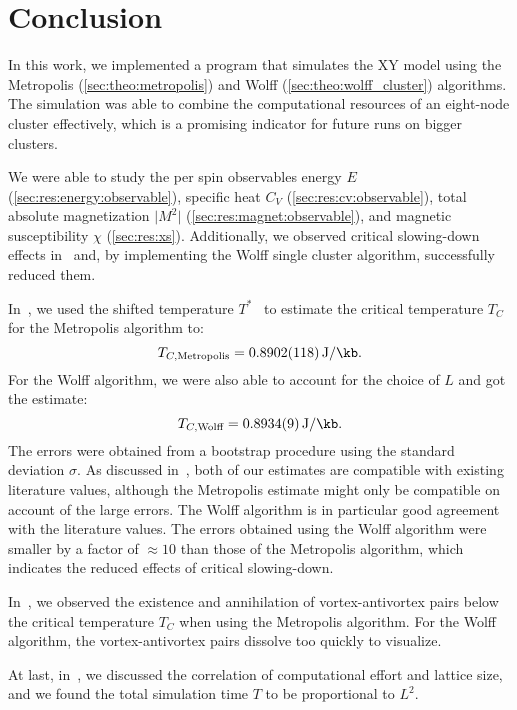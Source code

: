 \chapter{Conclusion}
	In this work, we implemented a program that simulates the XY model using the Metropolis (\cref{sec:theo:metropolis}) and Wolff (\cref{sec:theo:wolff_cluster}) algorithms. The simulation was able to combine the computational resources of an eight-node cluster effectively, which is a promising indicator for future runs on bigger clusters.
	
	We were able to study the per spin observables energy $E$ (\cref{sec:res:energy:observable}), specific heat $C_V$ (\cref{sec:res:cv:observable}), total absolute magnetization $\lvert M^2 \rvert$ (\cref{sec:res:magnet:observable}), and magnetic susceptibility $\chi$ (\cref{sec:res:xs}). Additionally, we observed critical slowing-down effects in~ and, by implementing the Wolff single cluster algorithm, successfully reduced them.
	
	In~, we used the shifted temperature $T^*$~\citep{shifted} to estimate the critical temperature $T_C$ for the Metropolis algorithm to:
	\begin{equation}
			T_{C, \text{Metropolis}} = \SI{0.8902(118)}{\J\per\kb}.
	\end{equation}
	For the Wolff algorithm, we were also able to account for the choice of $L$ and got the estimate:
	\begin{equation}
			T_{C, \text{Wolff}} = \SI{0.8934(9)}{\J\per\kb}.
	\end{equation}
	The errors were obtained from a bootstrap procedure using the standard deviation $\sigma$. As discussed in~, both of our estimates are compatible with existing literature values, although the Metropolis estimate might only be compatible on account of the large errors. The Wolff algorithm is in particular good agreement with the literature values. The errors obtained using the Wolff algorithm were smaller by a factor of $\approx 10$ than those of the Metropolis algorithm, which indicates the reduced effects of critical slowing-down.
	
	In~, we observed the existence and annihilation of vortex-antivortex pairs below the critical temperature $T_C$ when using the Metropolis algorithm. For the Wolff algorithm, the vortex-antivortex pairs dissolve too quickly to visualize.
	
	At last, in~, we discussed the correlation of computational effort and lattice size, and we found the total simulation time $T$ to be proportional to $L^2$.
	
